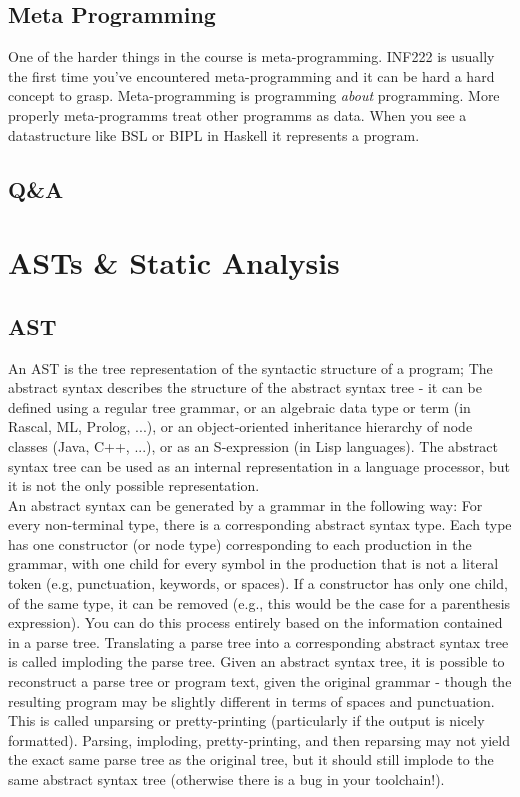 \documentclass[tikz, border=5mm]{article}
\begin{document}
    \subsection{Meta Programming}
    One of the harder things in the course is \gls{meta-programming}. INF222 is usually the first time you've encountered meta-programming and it can be hard a hard concept to grasp. 
    Meta-programming is programming \textit{about} programming. More properly meta-programms treat other programms as data. When you see a datastructure like \gls{BSL} or \gls{BIPL} in Haskell it
    represents a program.

    \subsection{Q\&A}

    \section{ASTs \& Static Analysis}
    \subsection{AST}
        An \gls{AST} is the tree representation of the syntactic structure of a program; The abstract syntax
        describes the structure of the abstract syntax tree - it can be defined using a
        regular tree grammar, or an algebraic data type or term (in Rascal, ML, Prolog,
        ...), or an object-oriented inheritance hierarchy of node classes (Java, C++, ...),
        or as an S-expression (in Lisp languages).
        The abstract syntax tree can be used as an internal representation in a language processor, 
        but it is not the only possible representation.\\
        An abstract syntax can be generated by a grammar in the following way:
        For every non-terminal type, there is a corresponding abstract syntax type.
        Each type has one constructor (or node type) corresponding to each production in the grammar, with one child for every symbol in the production that
        is not a literal token (e.g, punctuation, keywords, or spaces). If a constructor
        has only one child, of the same type, it can be removed (e.g., this would be
        the case for a parenthesis expression). You can do this process entirely based
        on the information contained in a parse tree. Translating a parse tree into a
        corresponding abstract syntax tree is called imploding the parse tree.
        Given an abstract syntax tree, it is possible to reconstruct a parse tree or program text, given the original grammar - though the resulting program may be
        slightly different in terms of spaces and punctuation. This is called unparsing or
        pretty-printing (particularly if the output is nicely formatted). Parsing, imploding, pretty-printing, and then reparsing may not yield the exact same parse tree
        as the original tree, but it should still implode to the same abstract syntax tree (otherwise there is a bug in your toolchain!).
\end{document}
